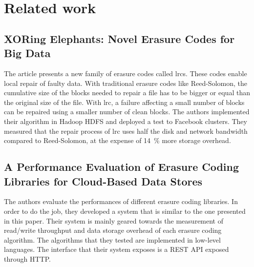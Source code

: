 \section{Related work}

\subsection{XORing Elephants: Novel Erasure Codes for Big Data \autocite{XorbasVLDB}}

The article presents a new family of erasure codes called \acp{lrc}.
These codes enable local repair of faulty data.
With traditional erasure codes like Reed-Solomon, the cumulative size of the blocks needed to repair a file has to be bigger or equal than the original size of the file.
With \ac{lrc}, a failure affecting a small number of blocks can be repaired using a smaller number of clean blocks.
The authors implemented their algorithm in Hadoop HDFS and deployed a test to Facebook clusters.
They measured that the repair process of \ac{lrc} uses half the disk and network bandwidth compared to Reed-Solomon, at the expense of \SI{14}{\percent} more storage overhead.

\subsection{A Performance Evaluation of Erasure Coding Libraries for Cloud-Based Data Stores \autocite{Burihabwa2016}}

The authors evaluate the performances of different erasure coding libraries.
In order to do the job, they developed a system that is similar to the one presented in this paper.
Their system is mainly geared towards the measurement of read/write throughput and data storage overhead of each erasure coding algorithm.
The algorithms that they tested are implemented in low-level languages.
The interface that their system exposes is a REST API exposed through HTTP.
